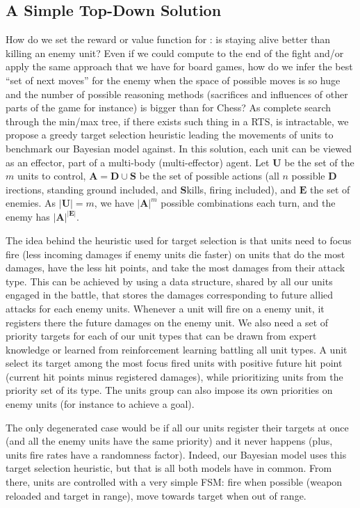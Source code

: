 \citep{SYNNAEVE:Micro}


\subsection{A Simple Top-Down Solution}
How do we set the reward or value function for : is staying alive better than killing an enemy unit? Even if we could compute to the end of the fight and/or apply the same approach that we have for board games, how do we infer the best ``set of next moves'' for the enemy when the space of possible moves is so huge and the number of possible reasoning methods (sacrifices and influences of other parts of the game for instance) is bigger than for Chess? As complete search through the min/max tree, if there exists such thing in a RTS, is intractable, we propose a greedy target selection heuristic leading the movements of units to benchmark our Bayesian model against. In this solution, each unit can be viewed as an effector, part of a multi-body (multi-effector) agent. 
Let $\mathbf{U}$ be the set of the $m$ units to control, $\mathbf{A} = \mathbf{D} \cup \mathbf{S}$ be the set of possible actions (all $n$ possible $\mathbf{D}$irections, standing ground included, and $\mathbf{S}$kills, firing included), and $\mathbf{E}$ the set of enemies. As $|\mathbf{U}| = m$, we have $|\mathbf{A}|^{m}$ possible combinations each turn, and the enemy has $|\mathbf{A}|^{|\mathbf{E}|}$. 
    
The idea behind the heuristic used for target selection is that units need to focus fire (less incoming damages if enemy units die faster) on units that do the most damages, have the less hit points, and take the most damages from their attack type. This can be achieved by using a data structure, shared by all our units engaged in the battle, that stores the damages corresponding to future allied attacks for each enemy units. Whenever a unit will fire on a enemy unit, it registers there the future damages on the enemy unit. We also need a set of priority targets for each of our unit types that can be drawn from expert knowledge or learned from reinforcement learning battling all unit types. A unit select its target among the most focus fired units with positive future hit point (current hit points minus registered damages), while prioritizing units from the priority set of its type. The units group can also impose its own priorities on enemy units (for instance to achieve a goal).

The only degenerated case would be if all our units register their targets at once (and all the enemy units have the same priority) and it never happens (plus, units fire rates have a randomness factor). 
Indeed, our Bayesian model uses this target selection heuristic, but that is all both models have in common. From there, units are controlled with a very simple FSM: fire when possible (weapon reloaded and target in range), move towards target when out of range.

